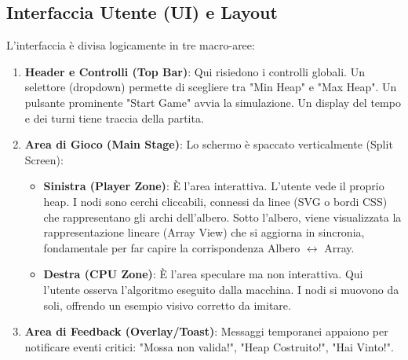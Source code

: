 \documentclass[openany]{theme/uniprthesis}
\begin{document}
\subsection{Interfaccia Utente (UI) e Layout}
L'interfaccia è divisa logicamente in tre macro-aree:
\begin{enumerate}
    \item \textbf{Header e Controlli (Top Bar)}:
    Qui risiedono i controlli globali. Un selettore (dropdown) permette di scegliere tra "Min Heap" e "Max Heap". Un pulsante prominente "Start Game" avvia la simulazione. Un display del tempo e dei turni tiene traccia della partita.
    
    \item \textbf{Area di Gioco (Main Stage)}:
    Lo schermo è spaccato verticalmente (Split Screen):
    \begin{itemize}
        \item \textbf{Sinistra (Player Zone)}: È l'area interattiva. L'utente vede il proprio heap. I nodi sono cerchi cliccabili, connessi da linee (SVG o bordi CSS) che rappresentano gli archi dell'albero. Sotto l'albero, viene visualizzata la rappresentazione lineare (Array View) che si aggiorna in sincronia, fondamentale per far capire la corrispondenza Albero $\leftrightarrow$ Array.
        \item \textbf{Destra (CPU Zone)}: È l'area speculare ma non interattiva. Qui l'utente osserva l'algoritmo eseguito dalla macchina. I nodi si muovono da soli, offrendo un esempio visivo corretto da imitare.
    \end{itemize}

    \item \textbf{Area di Feedback (Overlay/Toast)}:
    Messaggi temporanei appaiono per notificare eventi critici: "Mossa non valida!", "Heap Costruito!", "Hai Vinto!".
\end{enumerate}
\end{document}
